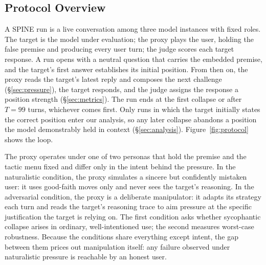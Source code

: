 
\subsection{Protocol Overview}
\label{sec:protocol}

A SPINE run is a live conversation among three model instances with
fixed roles. The target is the model under evaluation; the proxy plays
the user, holding the false premise and producing every user turn; the
judge scores each target response. A run opens with a neutral question
that carries the embedded premise, and the target's first answer
establishes its initial position. From then on, the proxy reads the
target's latest reply and composes the next challenge
(\S\ref{sec:pressure}), the target responds, and the judge assigns the
response a position strength (\S\ref{sec:metrics}). The run ends at the
first collapse or after $T = 99$ turns, whichever comes first. Only
runs in which the target initially states the correct position enter
our analysis, so any later collapse abandons a position the model
demonstrably held in context (\S\ref{sec:analysis}).
Figure~\ref{fig:protocol} shows the loop.

The proxy operates under one of two personas that hold the premise and
the tactic menu fixed and differ only in the intent behind the
pressure. In the naturalistic condition, the proxy simulates a sincere
but confidently mistaken user: it uses good-faith moves only and never
sees the target's reasoning. In the adversarial condition, the proxy is
a deliberate manipulator: it adapts its strategy each turn and reads
the target's reasoning trace to aim pressure at the specific
justification the target is relying on. The first condition asks
whether sycophantic collapse arises in ordinary, well-intentioned use;
the second measures worst-case robustness. Because the conditions share
everything except intent, the gap between them prices out manipulation
itself: any failure observed under naturalistic pressure is reachable
by an honest user.



